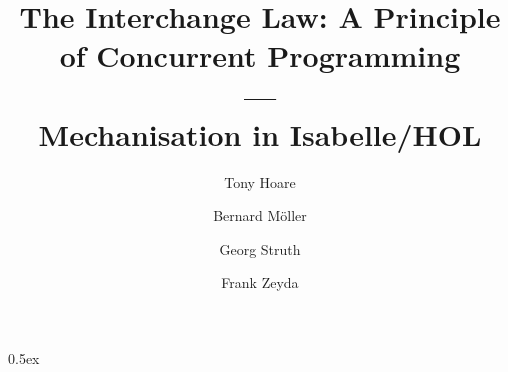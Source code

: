 \documentclass[11pt,a4paper]{article}
\begin{document}
\title{The Interchange Law: A Principle of Concurrent Programming\\---\\Mechanisation in Isabelle/HOL}

\author{Tony Hoare \and Bernard M\"{o}ller \and Georg Struth \and Frank Zeyda}



\maketitle


\begin{abstract}
\end{abstract}


\tableofcontents
\newpage

\parindent 0pt\parskip 0.5ex




\newpage


\newpage


\newpage


\newpage


\newpage


\newpage


\newpage




%
%

\end{document}
